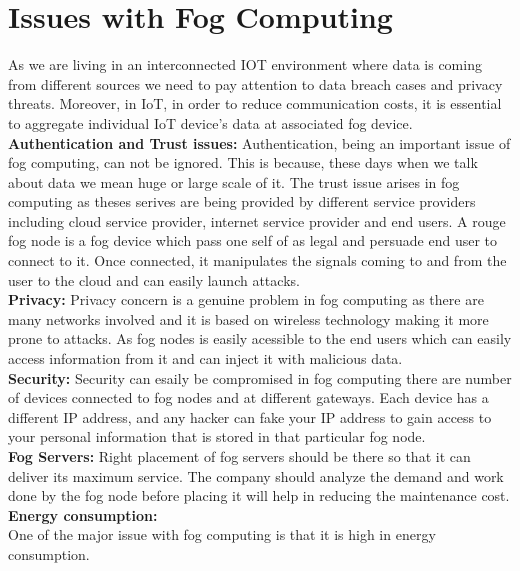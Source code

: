 \documentclass[10pt]{llncs}
\begin{document}
\section{Issues with Fog Computing}
As we are living in an interconnected IOT environment where data is coming from different  sources we need to pay attention to data breach cases and privacy threats. Moreover, in IoT, in order to reduce communication costs, it is essential to aggregate individual IoT device’s data at associated fog device.\\
\textbf{Authentication and Trust issues:} Authentication, being an important issue of fog computing, can not be ignored. This is because, these days when we talk about data we mean huge or large scale of it. The trust issue arises in fog computing as theses serives are being provided by different service providers including cloud service provider, internet service provider and end users. A rouge fog node is a fog device which pass one self of as legal and persuade end user to connect to it. Once connected, it manipulates the signals coming to and from the user to the cloud and can easily launch attacks.\\
\textbf{Privacy:} Privacy concern is a genuine problem in fog computing as there are many networks involved and it is based on wireless technology making it more prone to attacks. As fog nodes is easily acessible to the end users which can easily access information from it and can inject it with malicious data.\\
\textbf{Security:} Security can esaily be compromised in fog computing there are number of devices connected to fog nodes and at different gateways. Each device has a different IP address, and any hacker can fake your IP address to gain access to your personal information that is stored in that particular fog node.\\
\textbf{Fog Servers:} Right placement of fog servers should be there so that it can deliver its maximum service. The company should analyze the demand and work done by the fog node before placing it will help in reducing the maintenance cost.\\
\textbf{Energy consumption:}\\One of the major issue with fog computing is that it is high in energy consumption. \\
\end{document}
